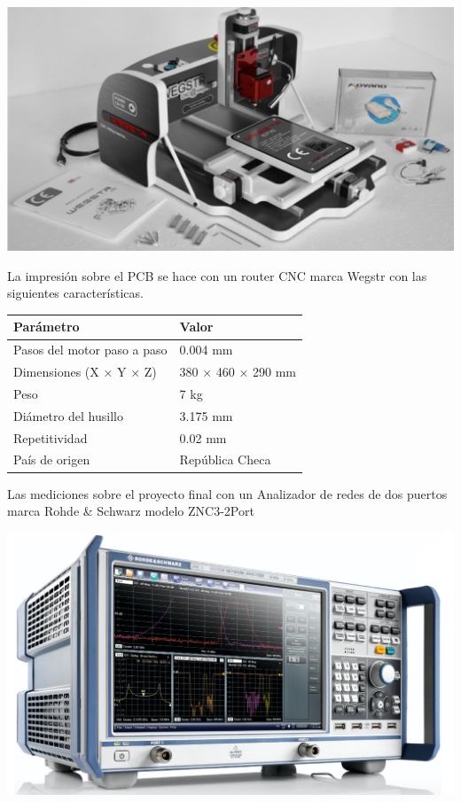 \documentclass[a4paper, 12pt]{article}
\begin{document}
\begin{minipage}{0.32\linewidth}
    \includegraphics[width=1\linewidth]{./img/wegstr.png}
\end{minipage}
\begin{minipage}{0.66\linewidth}
La impresión sobre el PCB se hace con un router CNC marca Wegstr \cite{wegstr} con las siguientes características.
\end{minipage}
\begin{tabular}{|l|l|}
\hline
\textbf{Parámetro} & \textbf{Valor} \\
\hline
Pasos del motor paso a paso & 0.004 mm \\
Dimensiones (X × Y × Z) & 380 × 460 × 290 mm \\
Peso & 7 kg \\
Diámetro del husillo & 3.175 mm \\
Repetitividad & 0.02 mm \\
País de origen & República Checa \\
\hline
\end{tabular}

\begin{minipage}{0.4\linewidth}
  Las mediciones sobre el proyecto final con un Analizador de redes de dos puertos marca Rohde \& Schwarz modelo ZNC3-2Port \cite{RS_ZNC}
\end{minipage}
\begin{minipage}{0.59\linewidth}
  \includegraphics[width=\linewidth]{./img/vna.png}
\end{minipage}
\end{document}
